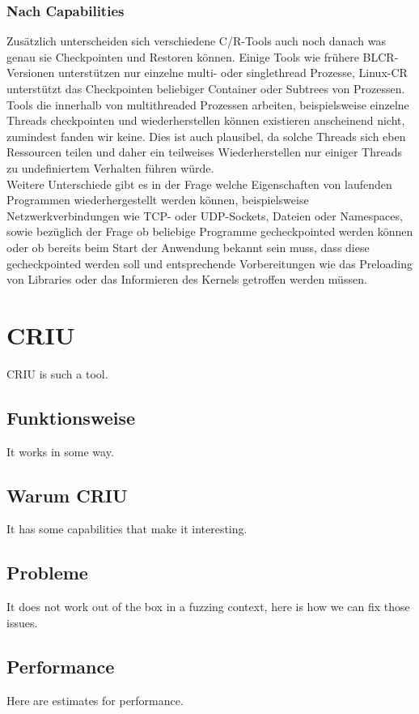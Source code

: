 \documentclass[12pt]{scrartcl}
\begin{document}
\subsubsection{Nach Capabilities}
Zusätzlich unterscheiden sich verschiedene C/R-Tools auch noch danach was genau sie Checkpointen und Restoren können. Einige Tools wie frühere BLCR-Versionen unterstützen nur einzelne multi- oder singlethread Prozesse, Linux-CR unterstützt das Checkpointen beliebiger Container oder Subtrees von Prozessen. Tools die innerhalb von multithreaded Prozessen arbeiten, beispielsweise einzelne Threads checkpointen und wiederherstellen können existieren anscheinend nicht, zumindest fanden wir keine. Dies ist auch plausibel, da solche Threads sich eben Ressourcen teilen und daher ein teilweises Wiederherstellen nur einiger Threads zu undefiniertem Verhalten führen würde.\\
Weitere Unterschiede gibt es in der Frage welche Eigenschaften von laufenden Programmen wiederhergestellt werden können, beispielsweise Netzwerkverbindungen wie TCP- oder UDP-Sockets, Dateien oder Namespaces, sowie bezüglich der Frage ob beliebige Programme gecheckpointed werden können oder ob bereits beim Start der Anwendung bekannt sein muss, dass diese gecheckpointed werden soll und entsprechende Vorbereitungen wie das Preloading von Libraries oder das Informieren des Kernels getroffen werden müssen.

\section{CRIU}
CRIU is such a tool. 
\subsection{Funktionsweise}
It works in some way. 
\subsection{Warum CRIU}
It has some capabilities that make it interesting. 
\subsection{Probleme}
It does not work out of the box in a fuzzing context, here is how we can fix those issues. 
\subsection{Performance}
Here are estimates for performance.
\end{document}
